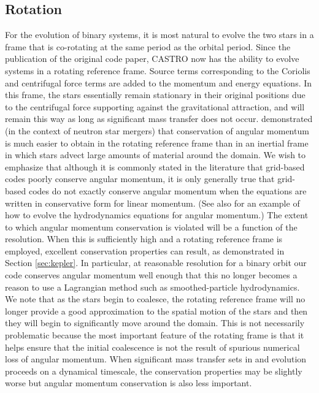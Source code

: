 \documentclass{emulateapj}
\begin{document}
\subsection{Rotation}\label{sec:rotation}

For the evolution of binary systems, it is most natural to evolve the
two stars in a frame that is co-rotating at the same period as the
orbital period. Since the publication of the original code paper, CASTRO 
now has the ability to evolve systems in a rotating reference frame. 
Source terms corresponding to the Coriolis and centrifugal 
force terms are added to the momentum and energy equations. In this frame, 
the stars essentially remain stationary in their original positions due to the
centrifugal force supporting against the gravitational attraction, and
will remain this way as long as significant mass transfer does not
occur. \cite{swc:2000} demonstrated (in the context of neutron star
mergers) that conservation of angular momentum is much easier to
obtain in the rotating reference frame than in an inertial frame in
which stars advect large amounts of material around the domain. We
wish to emphasize that although it is commonly stated in the
literature that grid-based codes poorly conserve angular momentum,
it is only generally true that grid-based codes do not exactly conserve 
angular momentum when the equations are written in conservative form
for linear momentum. (See also \cite{motl:2002} for an example of how 
to evolve the hydrodynamics equations for angular momentum.) 
The extent to which angular momentum conservation is violated
will be a function of the resolution. When this is sufficiently high
and a rotating reference frame is employed, excellent conservation
properties can result, as demonstrated in Section \ref{sec:kepler}. 
In particular, at reasonable resolution for a binary orbit our code 
conserves angular momentum well enough that this no longer becomes 
a reason to use a Lagrangian method such as smoothed-particle hydrodynamics.
We note that as the stars begin to coalesce, the rotating reference frame
will no longer provide a good approximation to the spatial motion of
the stars and then they will begin to significantly move around the
domain. This is not necessarily problematic because the most important
feature of the rotating frame is that it helps ensure that the initial
coalescence is not the result of spurious numerical loss of angular
momentum. When significant mass transfer sets in and evolution
proceeds on a dynamical timescale, the conservation properties may be
slightly worse but angular momentum conservation is also less
important.
\end{document}
